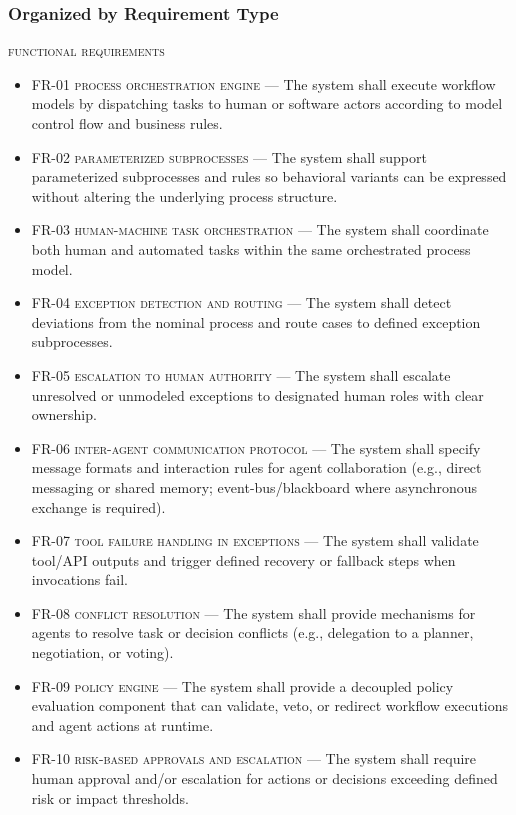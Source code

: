 \subsubsection*{Organized by Requirement Type}
\begin{footnotesize}
  \textsc{functional requirements}
    \begin{itemize}
        \item \textsc{FR-01 process orchestration engine} --- The system shall execute workflow models by dispatching tasks to human or software actors according to model control flow and business rules.
        \item \textsc{FR-02 parameterized subprocesses} --- The system shall support parameterized subprocesses and rules so behavioral variants can be expressed without altering the underlying process structure.
        \item \textsc{FR-03 human-machine task orchestration} --- The system shall coordinate both human and automated tasks within the same orchestrated process model.
        \item \textsc{FR-04 exception detection and routing} --- The system shall detect deviations from the nominal process and route cases to defined exception subprocesses.
        \item \textsc{FR-05 escalation to human authority} --- The system shall escalate unresolved or unmodeled exceptions to designated human roles with clear ownership.
        \item \textsc{FR-06 inter-agent communication protocol} --- The system shall specify message formats and interaction rules for agent collaboration (e.g., direct messaging or shared memory; event-bus/blackboard where asynchronous exchange is required).
        \item \textsc{FR-07 tool failure handling in exceptions} --- The system shall validate tool/API outputs and trigger defined recovery or fallback steps when invocations fail.
        \item \textsc{FR-08 conflict resolution} --- The system shall provide mechanisms for agents to resolve task or decision conflicts (e.g., delegation to a planner, negotiation, or voting).
        \item \textsc{FR-09 policy engine} --- The system shall provide a decoupled policy evaluation component that can validate, veto, or redirect workflow executions and agent actions at runtime.
        \item \textsc{FR-10 risk-based approvals and escalation} --- The system shall require human approval and/or escalation for actions or decisions exceeding defined risk or impact thresholds.

\end{itemize}
\end{footnotesize}
